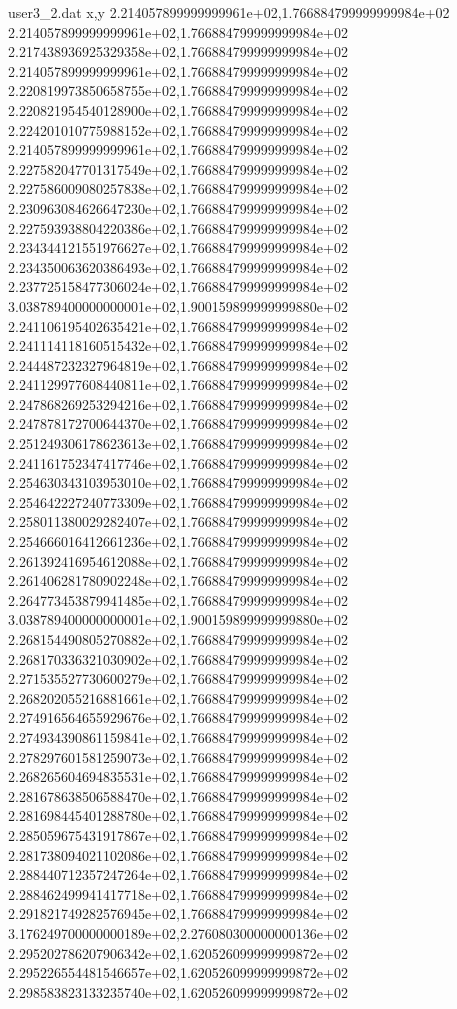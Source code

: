 \begin{filecontents}{user3_2.dat}
x,y
2.214057899999999961e+02,1.766884799999999984e+02
2.214057899999999961e+02,1.766884799999999984e+02
2.217438936925329358e+02,1.766884799999999984e+02
2.214057899999999961e+02,1.766884799999999984e+02
2.220819973850658755e+02,1.766884799999999984e+02
2.220821954540128900e+02,1.766884799999999984e+02
2.224201010775988152e+02,1.766884799999999984e+02
2.214057899999999961e+02,1.766884799999999984e+02
2.227582047701317549e+02,1.766884799999999984e+02
2.227586009080257838e+02,1.766884799999999984e+02
2.230963084626647230e+02,1.766884799999999984e+02
2.227593938804220386e+02,1.766884799999999984e+02
2.234344121551976627e+02,1.766884799999999984e+02
2.234350063620386493e+02,1.766884799999999984e+02
2.237725158477306024e+02,1.766884799999999984e+02
3.038789400000000001e+02,1.900159899999999880e+02
2.241106195402635421e+02,1.766884799999999984e+02
2.241114118160515432e+02,1.766884799999999984e+02
2.244487232327964819e+02,1.766884799999999984e+02
2.241129977608440811e+02,1.766884799999999984e+02
2.247868269253294216e+02,1.766884799999999984e+02
2.247878172700644370e+02,1.766884799999999984e+02
2.251249306178623613e+02,1.766884799999999984e+02
2.241161752347417746e+02,1.766884799999999984e+02
2.254630343103953010e+02,1.766884799999999984e+02
2.254642227240773309e+02,1.766884799999999984e+02
2.258011380029282407e+02,1.766884799999999984e+02
2.254666016412661236e+02,1.766884799999999984e+02
2.261392416954612088e+02,1.766884799999999984e+02
2.261406281780902248e+02,1.766884799999999984e+02
2.264773453879941485e+02,1.766884799999999984e+02
3.038789400000000001e+02,1.900159899999999880e+02
2.268154490805270882e+02,1.766884799999999984e+02
2.268170336321030902e+02,1.766884799999999984e+02
2.271535527730600279e+02,1.766884799999999984e+02
2.268202055216881661e+02,1.766884799999999984e+02
2.274916564655929676e+02,1.766884799999999984e+02
2.274934390861159841e+02,1.766884799999999984e+02
2.278297601581259073e+02,1.766884799999999984e+02
2.268265604694835531e+02,1.766884799999999984e+02
2.281678638506588470e+02,1.766884799999999984e+02
2.281698445401288780e+02,1.766884799999999984e+02
2.285059675431917867e+02,1.766884799999999984e+02
2.281738094021102086e+02,1.766884799999999984e+02
2.288440712357247264e+02,1.766884799999999984e+02
2.288462499941417718e+02,1.766884799999999984e+02
2.291821749282576945e+02,1.766884799999999984e+02
3.176249700000000189e+02,2.276080300000000136e+02
2.295202786207906342e+02,1.620526099999999872e+02
2.295226554481546657e+02,1.620526099999999872e+02
2.298583823133235740e+02,1.620526099999999872e+02

\end{filecontents}
